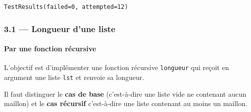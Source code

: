 \documentclass[a4paper,17pt]{extarticle}
\makeatletter
\newcommand{\boxspacing}{\kern\kvtcb@left@rule\kern\kvtcb@boxsep}
\newcommand{\prompt}[4]{
        \ttfamily\llap{{\color{#2}[#3]:\hspace{3pt}#4}}\vspace{-\baselineskip}
    }
\makeatother
\begin{document}
            \begin{tcolorbox}[breakable, size=fbox, boxrule=.5pt, pad at break*=1mm, opacityfill=0]
\prompt{Out}{outcolor}{2}{\boxspacing}
\begin{Verbatim}[commandchars=\\\{\}]
TestResults(failed=0, attempted=12)
\end{Verbatim}
\end{tcolorbox}
        
    \hypertarget{longueur-dune-liste}{%
\subsubsection{3.1 --- Longueur d'une liste}\label{longueur-dune-liste}}

    \hypertarget{par-une-fonction-ruxe9cursive}{%
\paragraph{Par une fonction
récursive}\label{par-une-fonction-ruxe9cursive}}

    L'objectif est d'implémenter une fonction récursive \texttt{longueur}
qui reçoit en argument une liste \texttt{lst} et renvoie sa longueur.

Il faut distinguer le \textbf{cas de base} (c'est-à-dire une liste vide
ne contenant aucun maillon) et le \textbf{cas récursif} c'est-à-dire une
liste contenant au moins un maillon.
\end{document}
